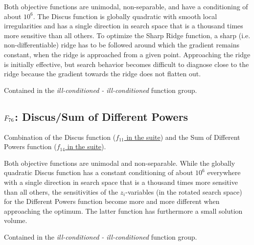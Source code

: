 Both objective functions are unimodal, non-separable, and have a conditioning
of about \(10^6\).
The Discus function is globally quadratic with smooth local irregularities
and has a single direction in search space that is a thousand times more
sensitive than all others.
To optimize the Sharp Ridge function, a sharp (i.e. non-differentiable) ridge
has to be followed around which the gradient remains constant, when the
ridge is approached from a given point. Approaching the ridge is
initially effective, but search behavior becomes difficult to diagnose
close to the ridge because the gradient towards the ridge does not flatten out.

Contained in the \emph{ill-conditioned - ill-conditioned} function group.



\subsection[\texorpdfstring{\protect\(F_{76}\protect\): Discus/Sum of Different Powers}{F76: Discus/Sum of Different Powers}]{\texorpdfstring{\protect\(F_{76}\protect\): Discus/Sum of Different Powers}{}}
\label{index:f76}\label{index:discus-sum-of-different-powers}
Combination of the Discus function (\href{https://coco.gforge.inria.fr/downloads/download16.00/bbobdocfunctions.pdf\#page=55}{\(f_{11}\) in the \bbob suite}) and the
Sum of Different Powers function (\href{https://coco.gforge.inria.fr/downloads/download16.00/bbobdocfunctions.pdf\#page=70}{\(f_{14}\) in the \bbob suite}).

Both objective functions are unimodal and non-separable. While the
globally quadratic Discus function has a constant conditioning
of about \(10^6\) everywhere
with a single direction in search space that is a thousand times more
sensitive than all others, the sensitivities of the
\(z_i\)-variables (in the rotated search space)
for the Different Powers function become more and more different when
approaching the optimum. The latter function has furthermore a small
solution volume.

Contained in the \emph{ill-conditioned - ill-conditioned} function group.



